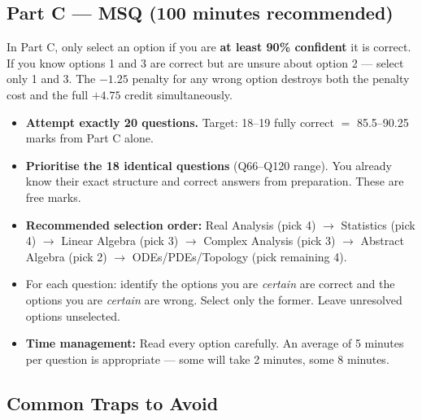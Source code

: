 \documentclass[12pt,a4paper]{article}
\begin{document}
\subsection{Part C — MSQ (100 minutes recommended)}

\begin{alertamber}
\small In Part C, only select an option if you are \textbf{at least 90\% confident} it is correct. If you know options 1 and 3 are correct but are unsure about option 2 --- select only 1 and 3. The $-1.25$ penalty for any wrong option destroys both the penalty cost and the full $+4.75$ credit simultaneously.
\end{alertamber}

\begin{itemize}[leftmargin=1.5em, itemsep=4pt]
  \item \textbf{Attempt exactly 20 questions.} Target: 18--19 fully correct $=$ 85.5--90.25 marks from Part C alone.
  \item \textbf{Prioritise the 18 identical questions} (Q66--Q120 range). You already know their exact structure and correct answers from preparation. These are free marks.
  \item \textbf{Recommended selection order:} Real Analysis (pick 4) $\to$ Statistics (pick 4) $\to$ Linear Algebra (pick 3) $\to$ Complex Analysis (pick 3) $\to$ Abstract Algebra (pick 2) $\to$ ODEs/PDEs/Topology (pick remaining 4).
  \item For each question: identify the options you are \textit{certain} are correct and the options you are \textit{certain} are wrong. Select only the former. Leave unresolved options unselected.
  \item \textbf{Time management:} Read every option carefully. An average of 5 minutes per question is appropriate — some will take 2 minutes, some 8 minutes.
\end{itemize}

\subsection{Common Traps to Avoid}
\end{document}
